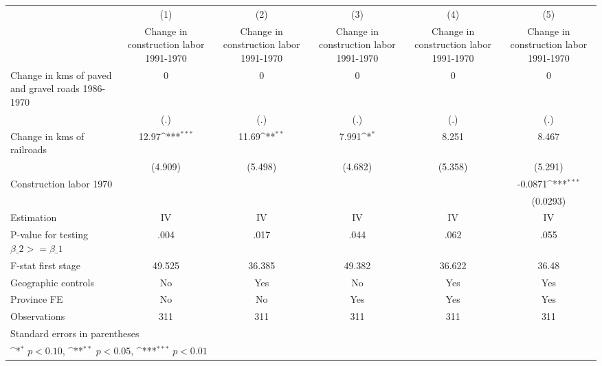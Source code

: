 {
\def\sym#1{\ifmmode^{#1}\else\(^{#1}\)\fi}
\begin{tabular}{l*{5}{c}}
\hline\hline
                    &\multicolumn{1}{c}{(1)}&\multicolumn{1}{c}{(2)}&\multicolumn{1}{c}{(3)}&\multicolumn{1}{c}{(4)}&\multicolumn{1}{c}{(5)}\\
                    &\multicolumn{1}{c}{Change in construction labor 1991-1970}&\multicolumn{1}{c}{Change in construction labor 1991-1970}&\multicolumn{1}{c}{Change in construction labor 1991-1970}&\multicolumn{1}{c}{Change in construction labor 1991-1970}&\multicolumn{1}{c}{Change in construction labor 1991-1970}\\
\hline
Change in kms of paved and gravel roads 1986-1970&           0         &           0         &           0         &           0         &           0         \\
                    &         (.)         &         (.)         &         (.)         &         (.)         &         (.)         \\
[1em]
Change in kms of railroads&       12.97\sym{***}&       11.69\sym{**} &       7.991\sym{*}  &       8.251         &       8.467         \\
                    &     (4.909)         &     (5.498)         &     (4.682)         &     (5.358)         &     (5.291)         \\
[1em]
Construction labor 1970&                     &                     &                     &                     &     -0.0871\sym{***}\\
                    &                     &                     &                     &                     &    (0.0293)         \\
\hline
Estimation          &          IV         &          IV         &          IV         &          IV         &          IV         \\
P-value for testing $\beta\_2 >= \beta\_1$&        .004         &        .017         &        .044         &        .062         &        .055         \\
F-stat first stage  &      49.525         &      36.385         &      49.382         &      36.622         &       36.48         \\
Geographic controls &          No         &         Yes         &          No         &         Yes         &         Yes         \\
Province FE         &          No         &          No         &         Yes         &         Yes         &         Yes         \\
Observations        &         311         &         311         &         311         &         311         &         311         \\
\hline\hline
\multicolumn{6}{l}{\footnotesize Standard errors in parentheses}\\
\multicolumn{6}{l}{\footnotesize \sym{*} \(p<0.10\), \sym{**} \(p<0.05\), \sym{***} \(p<0.01\)}\\
\end{tabular}
}
